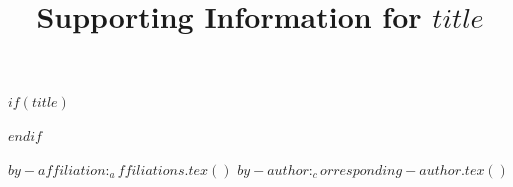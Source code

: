 $if(title)$
\title{Supporting Information for $title$}
$endif$

$by-affiliation:_affiliations.tex()$
$by-author:_corresponding-author.tex()$

\clearpage



